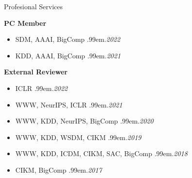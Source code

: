 \documentclass{resume} %
\makeatletter
\newcommand \Dotfill {\leavevmode \cleaders \hb@xt@ .99em{\hss .\hss }\hfill \kern \z@}
\makeatother
\begin{document}
\begin{rSection}{Profesional Services}


\textbf{PC Member}
\begin{itemize}[noitemsep]
	\item SDM, AAAI, BigComp \smallskip \Dotfill \emph{2022}
	\item KDD, AAAI, BigComp \smallskip \Dotfill \emph{2021}
\end{itemize}

\textbf{External Reviewer}
\begin{itemize}[noitemsep]
	\item ICLR \smallskip \Dotfill \emph{2022}
	\item WWW, NeurIPS, ICLR \smallskip \Dotfill \emph{2021}
	\item WWW, KDD, NeurIPS, BigComp \smallskip \Dotfill \emph{2020}
	\item WWW, KDD, WSDM, CIKM \smallskip \Dotfill \emph{2019}
	\item WWW, KDD, ICDM, CIKM, SAC, BigComp \smallskip \Dotfill \emph{2018}
	\item CIKM, BigComp \smallskip \Dotfill \emph{2017}
\end{itemize}

\end{rSection}


\begin{comment}
\begin{rSection}{Experience}

\textbf{Infosys Limited} \hfill Bengaluru, India \\ 
\emph{Student Intern} \hfill \emph{Jun. 2015 - Jul. 2015}

\textbf{SK Hynix} \hfill Incheon, South Korea \\ 
\emph{Student Intern} \hfill \emph{Dec. 2014 - Jan. 2015}

\textbf{KISTI} \hfill Daejeon, South Korea \\ 
\emph{Student Intern} \hfill \emph{Jan. 2014 - Feb. 2014}

\end{rSection}
\end{comment}

\end{document}
